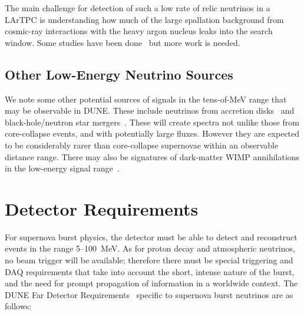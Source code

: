  The main challenge for detection of such
a low rate of relic neutrinos in a LArTPC is understanding how much of
the large spallation background from cosmic-ray interactions with the
heavy argon nucleus 
leaks into the search window.   Some studies have been done~\cite{Barker:2012nb} but more work is needed.

\subsection{Other Low-Energy Neutrino Sources}

We note some other potential sources of signals in the tens-of-MeV range that may be observable in DUNE.  These include neutrinos from accretion disks~\cite{Caballero:2011dw} and black-hole/neutron star mergers~\cite{Caballero:2009ww}.  These will create spectra not unlike those from core-collapse events, and with potentially large fluxes.  However they are expected to be considerably rarer than core-collapse supernovae within an observable distance range.  There may also be signatures of dark-matter WIMP annihilations in the low-energy signal range~\cite{Rott:2012qb, Bernal:2012qh}.



\section{Detector Requirements}
\label{sec:physics-snblowe-detector-requirements}

For supernova burst physics, the detector must be able to detect and reconstruct %
events in the range 5--100~MeV.  As for proton decay and atmospheric neutrinos, no beam trigger will be available; therefore there must be special triggering and DAQ requirements that take into account the short, intense nature of the burst, and the need for prompt propagation of information in a worldwide context.
The DUNE Far Detector
Requirements~\cite{lbnfdune-cdr-req} specific to supernova burst neutrinos are as follows:

